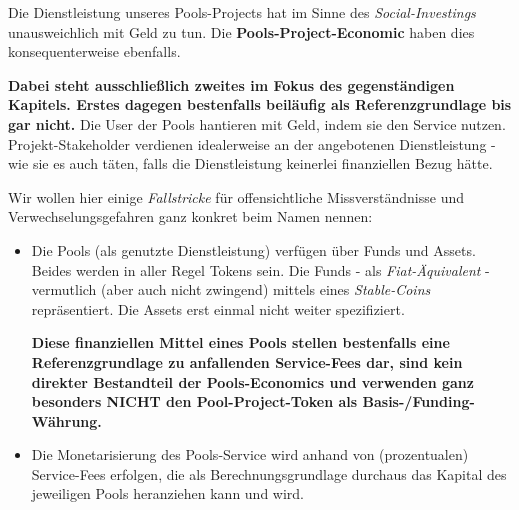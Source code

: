 \begin{Abgrenzung}

\vspace{0.2cm}

Die Dienstleistung unseres Pools-Projects hat im Sinne des \textit{Social-Investings} unausweichlich mit Geld zu tun. Die \textbf{Pools-Project-Economic} haben dies konsequenterweise ebenfalls.

\vspace{0.1cm}

\textbf{Dabei steht ausschließlich zweites im Fokus des gegenständigen Kapitels. Erstes dagegen bestenfalls beiläufig als Referenzgrundlage bis gar nicht.} Die User der Pools hantieren mit Geld, indem sie den Service nutzen. Projekt-Stakeholder verdienen idealerweise an der angebotenen Dienstleistung - wie sie es auch täten, falls die Dienstleistung keinerlei finanziellen Bezug hätte.

\vspace{0.75cm}

Wir wollen hier einige \textit{Fallstricke} für offensichtliche Missverständnisse und Verwechselungsgefahren ganz konkret beim Namen nennen:

\begin{itemize}
	\item Die Pools (als genutzte Dienstleistung) verfügen über Funds und Assets. Beides werden in aller Regel Tokens sein. Die Funds - als \textit{Fiat-Äquivalent} - vermutlich (aber auch nicht zwingend) mittels eines \textit{Stable-Coins} repräsentiert. Die Assets erst einmal nicht weiter spezifiziert. 
	
	\textbf{Diese finanziellen Mittel eines Pools stellen bestenfalls eine Referenzgrundlage zu anfallenden Service-Fees dar, sind kein direkter Bestandteil der Pools-Economics und verwenden ganz besonders NICHT den Pool-Project-Token als Basis-/Funding-Währung.}
	\item Die Monetarisierung des Pools-Service wird anhand von (prozentualen) Service-Fees erfolgen, die als Berechnungsgrundlage durchaus das Kapital des je\-weiligen Pools heranziehen kann und wird. 
	

\end{itemize}
\end{Abgrenzung}
